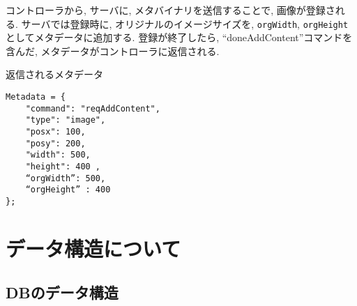 \documentclass[a4paper,10pt,oneside]{jsbook}
\begin{document}
コントローラから, サーバに, メタバイナリを送信することで, 画像が登録される. サーバでは登録時に,
オリジナルのイメージサイズを, \verb+orgWidth+, \verb+orgHeight+ としてメタデータに追加する. 
登録が終了したら, “doneAddContent”コマンドを含んだ, メタデータがコントローラに返信される. 

返信されるメタデータ

\begin{verbatim}
Metadata = {
    "command": "reqAddContent", 
    "type": "image", 
    "posx": 100, 
    "posy": 200, 
    "width": 500,
    "height": 400 ,
    “orgWidth”: 500,
    “orgHeight” : 400
};
\end{verbatim}


\chapter{データ構造について}

\section{DBのデータ構造}
\end{document}
